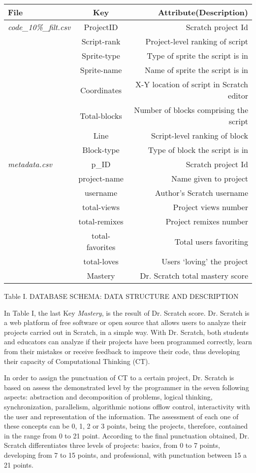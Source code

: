 \documentclass[a4paper,twocolumn,10pt]{article}
\begin{document}
\begin{center}
\begin{tabular}{ l | c | r  }
   \textbf{File} & \textbf{Key} & \textbf{Attribute(Description)} \\
 \hline  
   \textit{code\_10\%\_filt.csv} & ProjectID & Scratch project Id \\
    & Script-rank & Project-level ranking of script \\
    & Sprite-type & Type of sprite the script is in\\
    & Sprite-name & Name of sprite the script is in\\
    & Coordinates & X-Y location of script in Scratch editor\\
    & Total-blocks & Number of blocks comprising the script \\
    & Line & Script-level ranking of block \\
    & Block-type & Type of block the script is in\\
    \textit{metadata.csv} & p\_ID & Scratch project Id \\
    \hline
    & project-name & Name given to project \\
    & username & Author’s Scratch username\\
    & total-views & Project views number \\
    & total-remixes & Project remixes number \\
    & total-favorites & Total users favoriting \\
    & total-loves & Users ‘loving’ the project \\
    & Mastery & Dr. Scratch total mastery score\\
    \hline
    
\end{tabular}
Table I. DATABASE SCHEMA: DATA STRUCTURE AND DESCRIPTION
\end{center}

\par In Table I, the last Key \textit{Mastery}, is the result of Dr. Scratch
score. Dr. Scratch is a web platform of free software or open source that 
allows users to analyze their projects carried out in Scratch, in a simple
way. With Dr. Scratch, both students and educators can analyze if their
projects have been programmed correctly, learn from their mistakes or
receive feedback to improve their code, thus developing their capacity of
Computational Thinking (CT). \par
In order to assign the punctuation of CT to a certain project, Dr. Scratch
is based on assess the demonstrated level by the programmer in the seven
following aspects: abstraction and decomposition of problems, logical
thinking, synchronization, parallelism, algorithmic notions offlow control, 
interactivity with the user and representation of the information. The 
assessment of each one of these concepts can be 0, 1, 2 or 3 points, being
the projects, therefore, contained in the range from 0 to 21 point. According
to the final punctuation obtained, Dr. Scratch differentiates three levels of
projects: basics, from 0 to 7 points, developing from 7 to 15 points, and
professional, with punctuation between 15 a 21 points.
\end{document}

